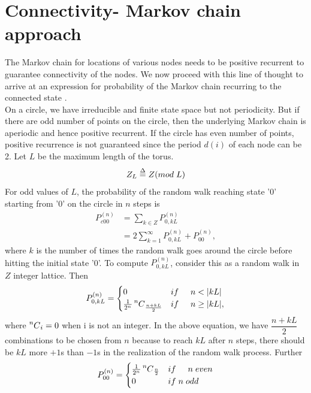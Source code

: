 \documentclass[a4paper,10pt,english]{article}
\newcommand\Mycomb[2][n]{\prescript{#1\mkern-0.5mu}{}C_{#2}}
\begin{document}
\section{Connectivity- Markov chain approach}\label{MC}
The Markov chain for locations of various nodes needs to be positive recurrent to guarantee connectivity of the nodes. We now proceed with this line of thought to arrive at an expression for probability of the Markov chain recurring to the connected state \cite{ross}.\\
On a circle, we have irreducible and finite state space but not periodicity.
But if there are odd number of points on the circle, then the underlying Markov chain is aperiodic and hence positive recurrent.
If the circle has even number of points, positive recurrence is not guaranteed since the period $d(i)$ of each node can be 2.
Let $L$ be the maximum length of the torus.
\begin{equation}
Z_L \overset{\Delta}{=} Z (mod \hspace{.1cm}L)
\end{equation}
For odd values of $L$, the probability of the random walk reaching state '0' starting from '0' on the circle in $n$ steps is 
\begin{align}
P_{c00}^{(n)} &= \sum_{k \in Z} P_{0,kL}^{(n)}\\
 &= 2 \sum_{k=1}^{\infty} P_{0, kL}^{(n)} + P_{00}^{(n)},
\end{align}
where $k$ is the number of times the random walk goes around the circle before hitting the initial state '0'. 
To compute $P_{0,kL}^{(n)}$, consider this as a random walk in $Z$ integer lattice. Then\\
\begin{equation}\label{pok}
P_{0,kL}^{(n)} =
\begin{cases}
 0  & if \hspace{.5cm}n < |kL|\\
 \frac{1}{2^n}
 \Mycomb[n]{\frac{n+kL}{2}}  & if \hspace{.5cm} n \geq |kL|,
 \end{cases}
\end{equation}
where $\Mycomb[n]{i}=0$ when i is not an integer.
In the above equation, we have $\dfrac{n+kL}{2}$ combinations to be chosen from $n$ because to reach $kL$ after $n$ steps, there should be $kL$ more $+1$s than $-1$s in the realization of the random walk process. Further\\
\begin{equation}\label{poo}
P_{00}^{(n)} =
\begin{cases}
\frac{1}{2^n} \Mycomb[n]{\frac{n}{2}} &if \hspace{0.5cm} n \hspace{0.1cm}even\\
0 \hspace{0.5cm}&if\hspace{0.1cm} n\hspace{0.1cm} odd
\end{cases}
\end{equation}
\end{document}
